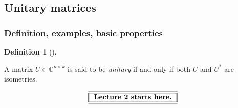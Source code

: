 \documentclass[numbers=enddot,12pt,final,onecolumn,notitlepage]{scrartcl}%
\numberwithin{exer}{subsection}
\theoremstyle{definition}
\newtheorem{defi}[theo]{Definition}
\newenvironment{definition}[1][]
{\begin{defi}[#1]\begin{leftbar}}
{\end{leftbar}\end{defi}}
\begin{document}
\subsection{Unitary matrices}

\subsubsection{Definition, examples, basic properties}

\begin{definition}
\label{def.unitary.unitary.unitary}A matrix $U\in\mathbb{C}^{n\times k}$ is
said to be \emph{unitary} if and only if both $U$ and $U^{\ast}$ are isometries.
\end{definition}

%

\[%
\begin{tabular}
[c]{||l||}\hline\hline
\textbf{Lecture 2 starts here.}\\\hline\hline
\end{tabular}
\]
\end{document}

